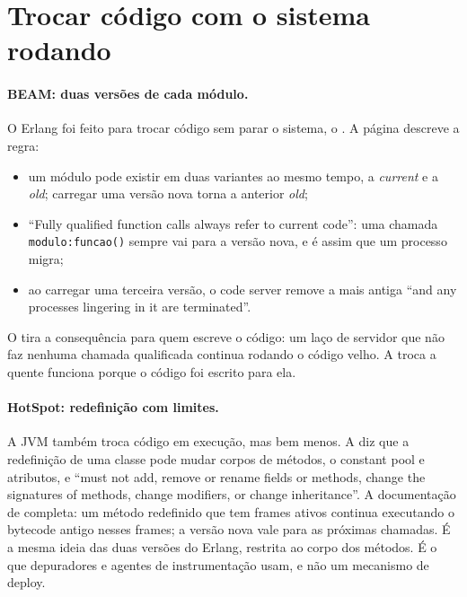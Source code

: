 \section{Trocar código com o sistema rodando}
\label{sec:vms-hot-code}

\paragraph{BEAM: duas versões de cada módulo.}
O Erlang foi feito para trocar código sem parar o sistema, o
. A página
 descreve a regra:
\begin{itemize}
\item um módulo pode existir em duas variantes ao mesmo tempo, a
  \emph{current} e a \emph{old}; carregar uma versão nova torna a anterior
  \emph{old};
\item \enquote{Fully qualified function calls always refer to current
  code}: uma chamada \texttt{modulo:funcao()} sempre vai para a versão
  nova, e é assim que um processo migra;
\item ao carregar uma terceira versão, o code server remove a mais antiga
  \enquote{and any processes lingering in it are terminated}.
\end{itemize}
O  tira a consequência para quem escreve o
código: um laço de servidor que não faz nenhuma chamada qualificada
continua rodando o código velho. A troca a quente funciona porque o
código foi escrito para ela.

\paragraph{HotSpot: redefinição com limites.}
A JVM também troca código em execução, mas bem menos. A
 diz que a redefinição de uma classe pode mudar
corpos de métodos, o constant pool e atributos, e \enquote{must not add,
remove or rename fields or methods, change the signatures of methods,
change modifiers, or change inheritance}. A documentação de
 completa: um método redefinido que tem
frames ativos continua executando o bytecode antigo nesses frames; a
versão nova vale para as próximas chamadas. É a mesma ideia das duas
versões do Erlang, restrita ao corpo dos métodos. É o que depuradores e
agentes de instrumentação usam, e não um mecanismo de deploy.

